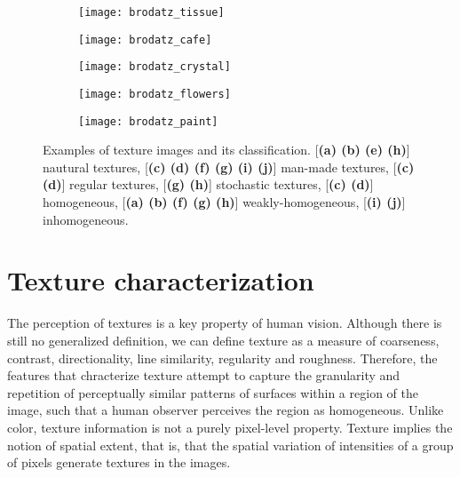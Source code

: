 \begin{figure}[!ht]
    \begin{subfigure}[b]{0.19\textwidth}
        \texttt{[image: brodatz\_tissue]}
        \caption{}
    \end{subfigure}
    \begin{subfigure}[b]{0.19\textwidth}
        \texttt{[image: brodatz\_cafe]}
        \caption{}
    \end{subfigure} 
    \begin{subfigure}[b]{0.19\textwidth}
        \texttt{[image: brodatz\_crystal]}
        \caption{}
    \end{subfigure}
    \begin{subfigure}[b]{0.19\textwidth}
        \texttt{[image: brodatz\_flowers]}
        \caption{}
    \end{subfigure}
    \begin{subfigure}[b]{0.19\textwidth}
        \texttt{[image: brodatz\_paint]}
        \caption{}
    \end{subfigure}    
                  
    \caption{ Examples of texture images and its classification. [{\small \textsf{\textbf{(a) (b) (e) (h)}}}] nautural textures, [{\small \textsf{\textbf{(c) (d) (f) (g) (i) (j)}}}] man-made textures, [{\small \textsf{\textbf{(c) (d)}}}] regular textures, [{\small \textsf{\textbf{(g) (h)}}}] stochastic textures, [{\small \textsf{\textbf{(c) (d)}}}] homogeneous, [{\small \textsf{\textbf{(a) (b) (f) (g) (h)}}}] weakly-homogeneous, [{\small \textsf{\textbf{(i) (j)}}}] inhomogeneous.}\label{fig:texture_images}    
\end{figure}


\section{Texture characterization}
The perception of textures is a key property of human vision. Although there is still no generalized definition, we can define texture as a measure of coarseness, contrast, directionality, line similarity, regularity and roughness. Therefore, the features that chracterize texture attempt to capture the granularity and repetition of perceptually similar patterns of surfaces within a region of the image, such that a human observer perceives the region as homogeneous.
Unlike color, texture information is not a purely pixel-level property. Texture implies the notion of spatial extent, that is, that the spatial variation of intensities of a group of pixels generate textures in the images.


